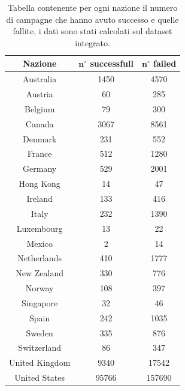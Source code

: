 \begin{table}
	\caption{Tabella contenente per ogni nazione il numero di campagne che hanno avuto successo e quelle fallite, i dati sono stati calcolati sul dataset integrato.}
	
	\label{tab:prj_succ_nosucc}
	
	\centering
	\begin{tabular}{|c|c|c|}
		\hline
		\textbf{Nazione} & \textbf{$\mathbf{n^{\circ}}$ successfull} & \textbf{$\mathbf{n^{\circ}}$ failed}\\ \hline
		Australia            &1450
&4570 \\ \hline
		Austria              &60
&285 \\ \hline
		Belgium              &79
&300 \\ \hline
		Canada               &3067
&8561 \\ \hline
		Denmark              &231
&552 \\ \hline
		France               &512
&1280 \\ \hline 
		Germany              &529
&2001 \\ \hline
		Hong Kong            &14
&47 \\ \hline
		Ireland              &133
&416 \\ \hline
		Italy                &232
&1390 \\ \hline
		Luxembourg           &13
&22 \\ \hline
		Mexico               &2
&14 \\ \hline
		Netherlands          &410
&1777 \\ \hline
		New Zealand          &330
&776 \\ \hline
		Norway               &108
&397 \\ \hline
		Singapore            &32
&46 \\ \hline
		Spain                &242
&1035 \\ \hline
		Sweden               &335
&876 \\ \hline
		Switzerland          &86
&347 \\ \hline
		United Kingdom       &9340
&17542 \\ \hline
		United States        &95766 &157690 \\ \hline
	\end{tabular}
\end{table}

